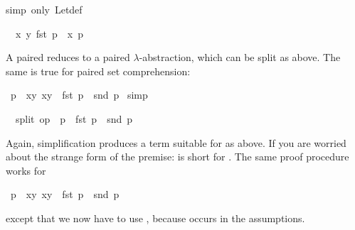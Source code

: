 \begin{isabellebody}
\isamarkupfalse%
{\isacharparenleft}simp\ only{\isacharcolon}\ Let{\isacharunderscore}def{\isacharparenright}%
\begin{isamarkuptxt}%
\begin{isabelle}%
\ {}{\isachardot}\ {\isacharparenleft}{\isasymlambda}{\isacharparenleft}x{\isacharcomma}\ y{\isacharparenright}{\isachardot}\ fst\ p\ {\isacharequal}\ x{\isacharparenright}\ p%
\end{isabelle}
A paired  reduces to a paired $\lambda$-abstraction, which
can be split as above. The same is true for paired set comprehension:%
\end{isamarkuptxt}%
\isamarkuptrue%
%
\endisatagproof
{\isafoldproof}%
%
\isadelimproof
%
\endisadelimproof
{}\isamarkupfalse%
\ {\isachardoublequoteopen}p\ {\isasymin}\ {\isacharbraceleft}{\isacharparenleft}x{\isacharcomma}y{\isacharparenright}{\isachardot}\ x{\isacharequal}y{\isacharbraceright}\ {\isasymlongrightarrow}\ fst\ p\ {\isacharequal}\ snd\ p{\isachardoublequoteclose}\isanewline
%
\isadelimproof
%
\endisadelimproof
%
\isatagproof
{}\isamarkupfalse%
\ simp%
\begin{isamarkuptxt}%
\begin{isabelle}%
\ {}{\isachardot}\ split\ op\ {\isacharequal}\ p\ {\isasymlongrightarrow}\ fst\ p\ {\isacharequal}\ snd\ p%
\end{isabelle}
Again, simplification produces a term suitable for 
as above. If you are worried about the strange form of the premise:
 is short for .
The same proof procedure works for%
\end{isamarkuptxt}%
\isamarkuptrue%
%
\endisatagproof
{\isafoldproof}%
%
\isadelimproof
%
\endisadelimproof
{}\isamarkupfalse%
\ {\isachardoublequoteopen}p\ {\isasymin}\ {\isacharbraceleft}{\isacharparenleft}x{\isacharcomma}y{\isacharparenright}{\isachardot}\ x{\isacharequal}y{\isacharbraceright}\ {\isasymLongrightarrow}\ fst\ p\ {\isacharequal}\ snd\ p{\isachardoublequoteclose}%
\isadelimproof
%
\endisadelimproof
%
\isatagproof
%
\begin{isamarkuptxt}%
\noindent
except that we now have to use , because
 occurs in the assumptions.


\end{isamarkuptxt}
\end{isabellebody}
